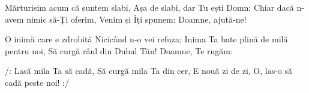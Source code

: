 \beginverse
Mărturisim acum că suntem slabi,
Așa de slabi, dar Tu ești Domn;
Chiar dacă n-avem nimic să-Ți oferim,
Venim și Îți spunem: Doamne, ajută-ne!
\endverse

\beginverse*
O inimă care e zdrobită
Nicicând n-o vei refuza;
Inima Ta bate plină de milă pentru noi,
Să curgă râul din Duhul Tău!
Doamne, Te rugăm:
\endverse

\beginchorus
/: Lasă mila Ta să cadă,
Să curgă mila Ta din cer,
E nouă zi de zi,
O, las-o să cadă peste noi! :/
\endchorus
\endsong